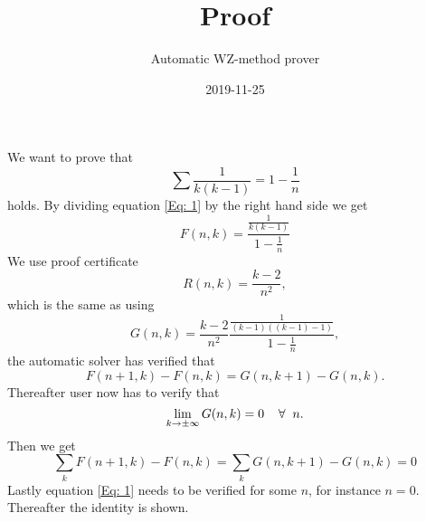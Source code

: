 \documentclass{article}
\title{Proof}
\author{Automatic WZ-method prover}
\date{2019-11-25}
\let\oldforall\forall
\renewcommand{\forall}{\hspace*{2mm}\oldforall\hspace*{1mm}}
\begin{document}
\maketitle
We want to prove that
\begin{equation}\label{Eq: 1}
\sum \frac{1}{k(k-1)} = 1-\frac{1}{n}
\end{equation}
holds. By dividing equation \ref{Eq: 1} by the right hand side we get
\begin{equation}
F(n,k)=\frac{\frac{1}{k(k-1)}}{1-\frac{1}{n}}
\end{equation}
We use proof certificate
\begin{equation}
R(n,k)=\frac{k-2}{n^2},
\end{equation}
which is the same as using
\begin{equation}
G(n,k)=\frac{k-2}{n^2}\frac{\frac{1}{(k-1)((k-1)-1)}}{1-\frac{1}{n}},
\end{equation}
the automatic solver has  verified that
\begin{equation}\label{Eq: WZ1}
F(n+1,k)-F(n,k)=G(n,k+1)-G(n,k).
\end{equation}
Thereafter user now has to verify that
\begin{equation}
\lim_{k\to\pm\infty}G(n,k)=0\forall n.
\end{equation}
Then we get
\begin{equation}
\sum_k F(n+1,k)-F(n,k)=\sum_k G(n,k+1)-G(n,k)=0\end{equation}Lastly equation \ref{Eq: 1} needs to be verified for some $n$, for instance $n=0$. Thereafter the identity is shown.
\end{document}
